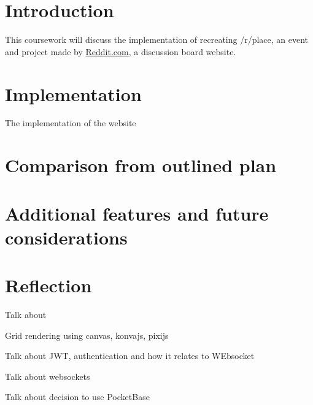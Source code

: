 

\section{Introduction}\label{sec:introduction}

This coursework will discuss the implementation of recreating /r/place, an event and project made by \href{https://www.reddit.com/}{Reddit.com}, a discussion board website.

\section{Implementation}\label{subsec:implementation}

The implementation of the website


\section{Comparison from outlined plan}\label{sec:comparison-from-outlined-plan}


\section{Additional features and future considerations}

\section{Reflection}

Talk about

Grid rendering using canvas, konvajs, pixijs

Talk about JWT, authentication and how it relates to WEbsocket

Talk about websockets

Talk about decision to use PocketBase
